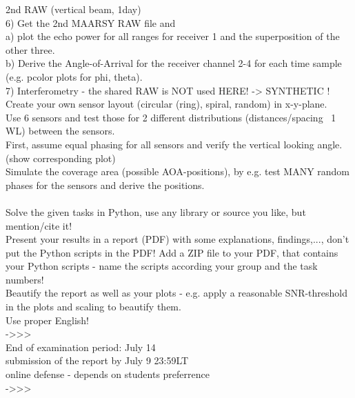 \begin{taskspec}
2nd RAW (vertical beam, 1day)\\
6) Get the 2nd MAARSY RAW file and \\
a) plot the echo power for all ranges for receiver 1 and the superposition of the other three.\\
b) Derive the Angle-of-Arrival for the receiver channel 2-4 for each time sample (e.g. pcolor plots for phi, theta).\\


7) Interferometry - the shared RAW is NOT used HERE! -> SYNTHETIC !\\
Create your own sensor layout (circular (ring), spiral, random) in x-y-plane.\\
Use 6 sensors and test those for 2 different distributions (distances/spacing ~1 WL) between the sensors.\\
First, assume equal phasing for all sensors and verify the vertical looking angle. (show corresponding plot)\\
Simulate the coverage area (possible AOA-positions), by e.g. test MANY random phases for the sensors and derive the positions.\\\\

Solve the given tasks in Python, use any library or source you like, but mention/cite it!\\


Present your results in a report (PDF) with some explanations, findings,..., don't put the Python scripts in the PDF! Add a ZIP file to your PDF, that contains your Python scripts - name the scripts according your group and the task numbers!\\

Beautify the report as well as your plots - e.g. apply a reasonable SNR-threshold in the plots and scaling to beautify them.\\

Use proper English!\\


->>>\\
End of examination period: July 14\\

submission of the report by July 9 23:59LT\\

online defense - depends on students preferrence\\
->>>
\end{taskspec}
